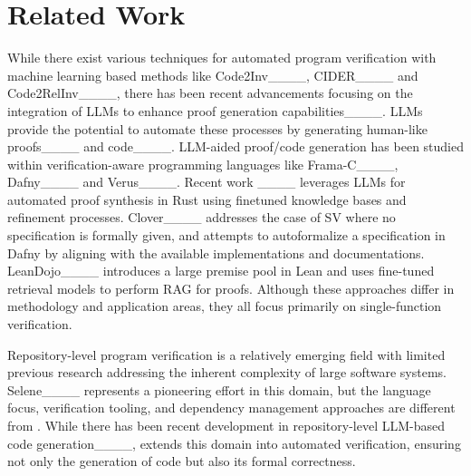 \section{Related Work}
 While there exist various techniques for automated program verification with machine learning based methods like Code2Inv____, CIDER____ and Code2RelInv____, there has been recent advancements focusing on the integration of LLMs to enhance proof generation capabilities____. LLMs provide the potential to automate these processes by generating human-like proofs____ and code____. LLM-aided proof/code generation has been studied within verification-aware programming languages like Frama-C____, Dafny____ and Verus____. Recent work \autoverus ____ leverages LLMs for automated proof synthesis in Rust using finetuned knowledge bases and refinement processes. Clover____ addresses the case of SV where no specification is formally given, and attempts to autoformalize a specification in Dafny by aligning with the available implementations and documentations. LeanDojo____ introduces a large premise pool in Lean and uses fine-tuned retrieval models to perform RAG for proofs. Although these approaches differ in methodology and application areas, they all focus primarily on single-function verification. 

 Repository-level program verification is a relatively emerging field with limited previous research addressing the inherent complexity of large software systems. Selene____ represents a pioneering effort in this domain, but the language focus, verification tooling, and dependency management approaches are different from \ragverus. While there has been recent development in repository-level LLM-based code generation____, \ragverus extends this domain into automated verification, ensuring not only the generation of code but also its formal correctness.